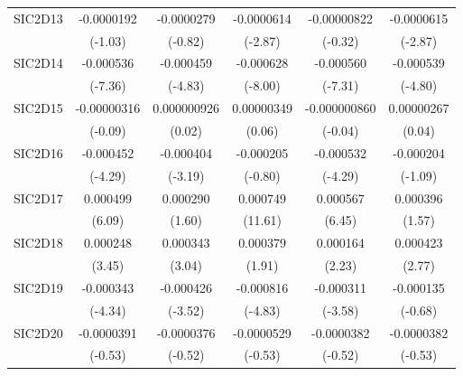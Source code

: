 \begin{table}[htbp]
\begin{tabular}{l*{5}{c}}
SIC2D13     &  -0.0000192         &  -0.0000279         &  -0.0000614\sym{**} & -0.00000822         &  -0.0000615\sym{**} \\
            &     (-1.03)         &     (-0.82)         &     (-2.87)         &     (-0.32)         &     (-2.87)         \\
SIC2D14     &   -0.000536\sym{***}&   -0.000459\sym{***}&   -0.000628\sym{***}&   -0.000560\sym{***}&   -0.000539\sym{***}\\
            &     (-7.36)         &     (-4.83)         &     (-8.00)         &     (-7.31)         &     (-4.80)         \\
SIC2D15     & -0.00000316         & 0.000000926         &  0.00000349         &-0.000000860         &  0.00000267         \\
            &     (-0.09)         &      (0.02)         &      (0.06)         &     (-0.04)         &      (0.04)         \\
SIC2D16     &   -0.000452\sym{***}&   -0.000404\sym{**} &   -0.000205         &   -0.000532\sym{***}&   -0.000204         \\
            &     (-4.29)         &     (-3.19)         &     (-0.80)         &     (-4.29)         &     (-1.09)         \\
SIC2D17     &    0.000499\sym{***}&    0.000290         &    0.000749\sym{***}&    0.000567\sym{***}&    0.000396         \\
            &      (6.09)         &      (1.60)         &     (11.61)         &      (6.45)         &      (1.57)         \\
SIC2D18     &    0.000248\sym{***}&    0.000343\sym{**} &    0.000379         &    0.000164\sym{*}  &    0.000423\sym{**} \\
            &      (3.45)         &      (3.04)         &      (1.91)         &      (2.23)         &      (2.77)         \\
SIC2D19     &   -0.000343\sym{***}&   -0.000426\sym{***}&   -0.000816\sym{***}&   -0.000311\sym{***}&   -0.000135         \\
            &     (-4.34)         &     (-3.52)         &     (-4.83)         &     (-3.58)         &     (-0.68)         \\
SIC2D20     &  -0.0000391         &  -0.0000376         &  -0.0000529         &  -0.0000382         &  -0.0000382         \\
            &     (-0.53)         &     (-0.52)         &     (-0.53)         &     (-0.52)         &     (-0.53)         \\

\end{tabular}
\end{table}
